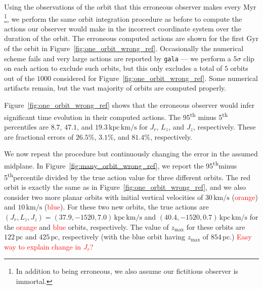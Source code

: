 \documentclass[twocolumn]{aastex62}
\newcommand{\Gus}[1]{\textcolor{red}{#1}}
\newcommand{\pc}{\text{pc}}
\newcommand{\kpc}{\text{kpc}}
\newcommand{\Myr}{\text{Myr}}
\newcommand{\Gyr}{\text{Gyr}}
\newcommand{\kms}{\text{km}/\text{s}}
\newcommand{\actunit}{\text{kpc}\,\kms}
\newcommand{\uth}{\textsuperscript{th}}
\begin{document}
Using the observations of the orbit that this erroneous observer makes every
$\Myr$\footnote{In addition to being erroneous, we also assume our fictitious
observer is immortal.}, we perform the same orbit integration procedure as
before to compute the actions our observer would make in the incorrect
coordinate system over the duration of the orbit. The erroneous computed
actions are shown for the first $\Gyr$ of the orbit in
Figure~\ref{fig:one_orbit_wrong_ref}. Occasionally the numerical scheme fails
and very large actions are reported by \texttt{gala}
--- we perform a $5\sigma$ clip on each action to exclude such orbits, but
this only excludes a total of $5$ orbits out of the $1000$ considered for
Figure~\ref{fig:one_orbit_wrong_ref}. Some numerical artifacts remain, but the
vast majority of orbits are computed properly.

Figure~\ref{fig:one_orbit_wrong_ref} shows that the erroneous observer would
infer significant time evolution in their computed actions. The
95\textsuperscript{th} minus 5\textsuperscript{th} percentiles are $8.7$,
$47.1$, and $19.3\,\actunit$ for $J_r$, $L_z$, and $J_z$, respectively. These
are fractional errors of $26.5\%$, $3.1\%$, and $81.4\%$, respectively.

\begin{figure*}
\caption{The artificial phase-dependence in the observed actions induced by an
error in the Galactocentric coordinate system. We consider here an orbit with
initial position $(8,0,0)\,\kpc$ and initial velocity $(0,-190,50)\,\kms$.
This corresponds to an orbit with actions $(J_r, L_z, J_z) = (32.5, -1520,
23.0)\,\actunit$ and $z_{\text{max}}=854\,\pc$. Considering the first $\Gyr$
of this orbit, we assume an immortal observer }
\label{fig:one_orbit_wrong_ref}
\end{figure*}

We now repeat the procedure but continuously changing the error in the assumed
midplane. In Figure~\ref{fig:many_orbit_wrong_ref}, we report the 95\uth minus
5\uth percentile divided by the true action value for three different orbits.
The red orbit is exactly the same as in Figure~\ref{fig:one_orbit_wrong_ref},
and we also consider two more planar orbits with initial vertical velocities
of $30\,\kms$ (\Gus{orange}) and $10\,\kms$ (\Gus{blue}). For these two new
orbits, the true actions are $(J_r, L_z, J_z) = (37.9, -1520, 7.0)\,\actunit$
and $(40.4, -1520, 0.7)\,\actunit$ for the \Gus{orange} and \Gus{blue} orbits,
respectively. The value of $z_{\text{max}}$ for these orbits are $122\,\pc$
and $425\,\pc$, respectively (with the blue orbit having $z_{\text{max}}$ of
$854\,\pc$.) \Gus{Easy way to explain change in $J_r$?}
\end{document}
